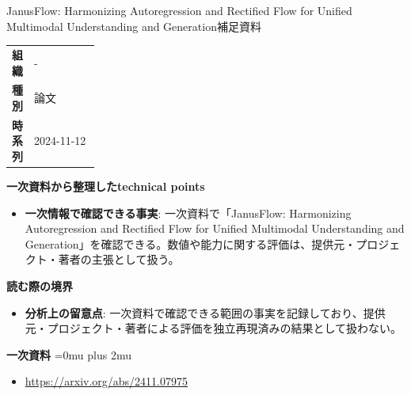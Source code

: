 \begin{technicalnote}{JanusFlow: Harmonizing Autoregression and Rectified Flow for Unified Multimodal Understanding and Generation}{補足資料}
\begingroup
\begin{tabularx}{\linewidth}{@{}>{\bfseries}p{0.22\linewidth}X@{}}
組織 & - \\
種別 & 論文 \\
時系列 & 2024-11-12 \\
\end{tabularx}
\smallskip
{\bfseries 一次資料から整理したtechnical points}
\begin{itemize}[leftmargin=1.5em,itemsep=0.35em]
\item \textbf{一次情報で確認できる事実}: 一次資料で「JanusFlow: Harmonizing Autoregression and Rectified Flow for Unified Multimodal Understanding and Generation」を確認できる。数値や能力に関する評価は、提供元・プロジェクト・著者の主張として扱う。
\end{itemize}
\begin{minipage}{\linewidth}
{\bfseries 読む際の境界}
\begin{itemize}[leftmargin=1.5em,itemsep=0.35em]
\item \textbf{分析上の留意点}: 一次資料で確認できる範囲の事実を記録しており、提供元・プロジェクト・著者による評価を独立再現済みの結果として扱わない。
\end{itemize}
\begin{samepage}
{\bfseries 一次資料}
\begingroup\sloppy
\Urlmuskip=0mu plus 2mu\relax
\begin{itemize}[leftmargin=1.5em,itemsep=0.25em]
\item {\scriptsize\url{https://arxiv.org/abs/2411.07975}}
\end{itemize}
\endgroup
\end{samepage}
\end{minipage}
\endgroup
\end{technicalnote}
\medskip

